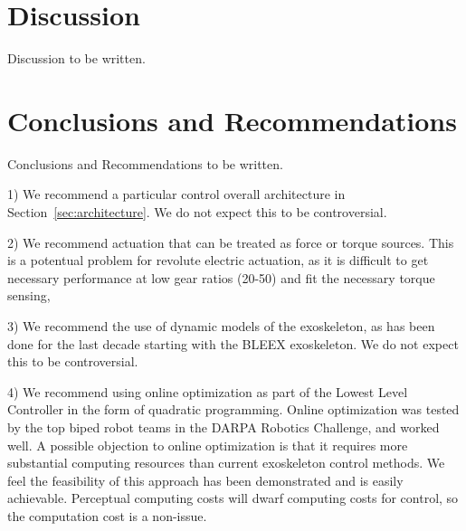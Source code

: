 \documentclass[letterpaper,12pt,fullpage]{article}
\begin{document}




\section{Discussion}

Discussion to be written.

\section{Conclusions and Recommendations}

Conclusions and Recommendations to be written.

1) We recommend a particular control 
overall architecture in Section~\ref{sec:architecture}.
We do not expect this to be controversial.

2) We recommend actuation that can be treated as force or torque sources.
This is a potentual problem for revolute electric actuation, as it
is difficult to get necessary performance at low gear ratios (20-50)
and fit the necessary torque sensing,

3) We recommend the use of dynamic models of the exoskeleton, as has been done
for the last decade starting with the BLEEX exoskeleton.
We do not expect this to be controversial.

4) We recommend using online optimization as part of the Lowest Level Controller
in the form of quadratic programming. Online optimization
was tested by the top biped robot
teams in the DARPA Robotics Challenge, and worked well.
A possible objection to online optimization
is that it requires more substantial computing
resources than current exoskeleton control methods. We feel the feasibility
of this approach has been demonstrated and is easily achievable. Perceptual
computing costs will dwarf computing costs for control, 
so the computation cost is a non-issue.
\end{document}
